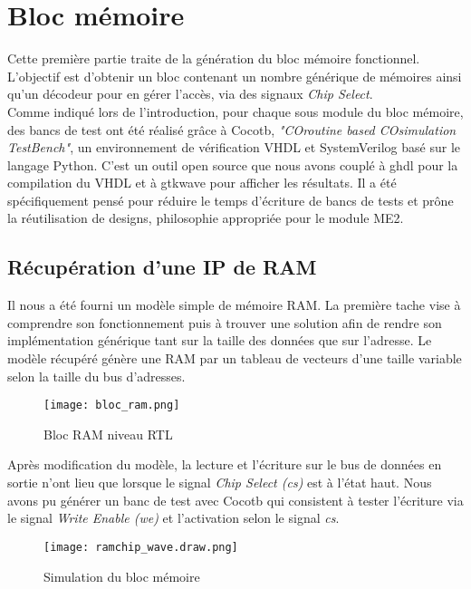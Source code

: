 \section{Bloc mémoire}

\indent Cette première partie traite de la génération du bloc mémoire fonctionnel.
L'objectif est d'obtenir un bloc contenant un nombre générique de mémoires ainsi qu'un décodeur pour en gérer l'accès, via des signaux \textit{Chip Select}. \\
\indent Comme indiqué lors de l'introduction, pour chaque sous module du bloc mémoire, des bancs de test ont été réalisé grâce à Cocotb, \textit{"COroutine based COsimulation TestBench"}, un environnement de vérification VHDL et SystemVerilog basé sur le langage Python.
C'est un outil open source que nous avons couplé à ghdl pour la compilation du VHDL et à gtkwave pour afficher les résultats.
Il a été spécifiquement pensé pour réduire le temps d'écriture de bancs de tests et prône la réutilisation de designs, philosophie appropriée pour le module ME2.

\subsection{Récupération d'une IP de RAM}

\indent Il nous a été fourni un modèle simple de mémoire RAM.
La première tache vise à comprendre son fonctionnement puis à trouver une solution afin de rendre son implémentation générique tant sur la taille des données que sur l'adresse.
Le modèle récupéré génère une RAM par un tableau de vecteurs d'une taille variable selon la taille du bus d'adresses.

\begin{figure}[h]
	\centering
	\texttt{[image: bloc\_ram.png]}
	\caption{Bloc RAM niveau RTL}
	\label{fig:synth_bloc_ram}
\end{figure}

\indent Après modification du modèle, la lecture et l'écriture sur le bus de données en sortie n'ont lieu que lorsque le signal \textit{Chip Select (cs)} est à l'état haut.
Nous avons pu générer un banc de test avec Cocotb qui consistent à tester l'écriture via le signal \textit{Write Enable (we)} et l'activation selon le signal \textit{cs}.

\begin{figure}[h]
	\centering
	\texttt{[image: ramchip\_wave.draw.png]}
	\caption{Simulation du bloc mémoire}
	\label{fig:wave_bloc_ram}
\end{figure}


